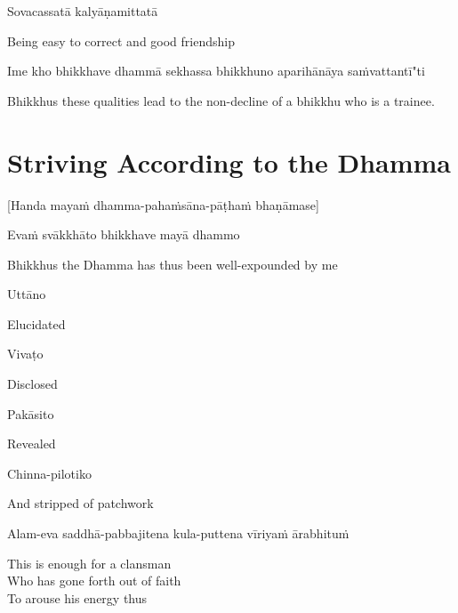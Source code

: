 Sovacassatā kalyāṇamittatā

\begin{cprenglish}
  Being easy to correct and good friendship
\end{cprenglish}

Ime kho bhikkhave dhammā sekhassa bhikkhuno aparihānāya saṁvattantī"ti

\begin{cprenglish}
  Bhikkhus these qualities lead to the non-decline of a bhikkhu who is a trainee.
\end{cprenglish}

\suttaRef{[AN 6.22 \& 8.79]}

\section{Striving According to the Dhamma}
\label{striving-according-to-dhamma}

\begin{center}
  [Handa mayaṁ dhamma-pahaṁsāna-pāṭhaṁ bhaṇāmase]
\end{center}

Evaṁ svākkhāto bhikkhave mayā dhammo

\begin{cprenglish}
  Bhikkhus the Dhamma has thus been well-expounded by me
\end{cprenglish}

Uttāno

\begin{cprenglish}
  Elucidated
\end{cprenglish}

Vivaṭo

\begin{cprenglish}
  Disclosed
\end{cprenglish}

Pakāsito

\begin{cprenglish}
  Revealed
\end{cprenglish}

Chinna-pilotiko

\begin{cprenglish}
  And stripped of patchwork
\end{cprenglish}

Alam-eva saddhā-pabbajitena kula-puttena vīriyaṁ ārabhituṁ

\begin{cprenglish}
  This is enough for a clansman\\
  Who has gone forth out of faith\\
  To arouse his energy thus
\end{cprenglish}

